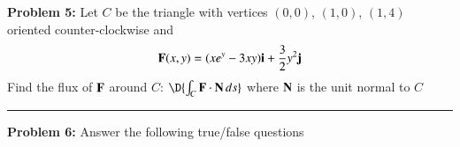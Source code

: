 \documentclass[11pt]{article}
\begin{document}

{\bf Problem 5:} Let \(C\) be the triangle with vertices \((0,0)\), \((1,0)\), \((1,4)\) oriented counter-clockwise and 
\[{\bf F}(x,y) = (xe^{y}-3xy) {\bf i} + \frac{3}{2}y^2 {\bf j}\]
Find the flux of \({\bf F}\) around \(C\): \(\D{\int_C {\bf F}\cdot {\bf N} \, ds}\) where \({\bf N}\) is the unit normal to \(C\)

\vspace{10.3cm}

\medskip\goodbreak\hrule\nobreak

%
%

{\bf Problem 6:} Answer the following true/false questions

\vspace{0.1cm}
\end{document}
